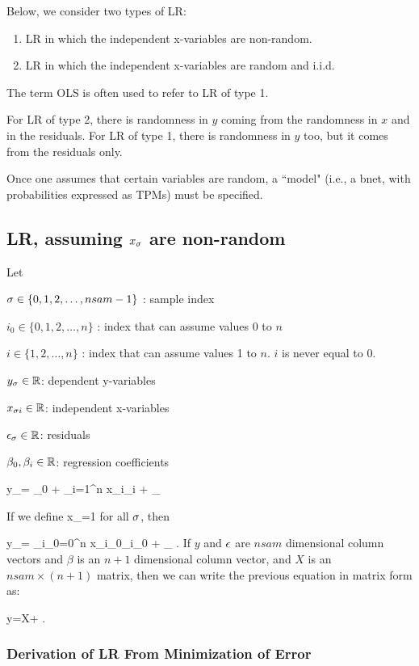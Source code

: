 Below, we consider two types of LR:

\begin{enumerate}
\item
LR
in which the independent x-variables are non-random.
\item
LR
in which the independent x-variables are random
and i.i.d.
\end{enumerate}

The  term OLS
is often used to refer to LR 
of type 1.



For LR of type 2,
there is randomness in $y$ 
coming from the randomness in $x$
and in the residuals.
For LR of type 1,
there  is randomness in $y$
too, but
it comes 
from the residuals
only. 

Once one assumes that certain
variables are random, a ``model" (i.e., a bnet,
with probabilities expressed as TPMs)
 must be 
specified.


\subsection{LR, assuming
$x_\sigma$ are non-random}

Let

$\sigma\in\{0, 1, 2, \ldots, nsam-1\}$ : sample index

$i_0\in\{0, 1, 2, \ldots, n\}$ : 
index that can assume values 0 to $n$

$i\in\{1, 2, \ldots, n\}$ : 
index that can assume values 1 to $n$.
$i$ is never equal to 0.


$y_\sigma\in { \mathbb{R}}$: dependent y-variables

$x_{\sigma i}\in { \mathbb{R}}$: independent x-variables

$\epsilon_\sigma\in { \mathbb{R}}$: residuals

$\beta_0, \beta_i\in { \mathbb{R}}$: 
regression coefficients


\beq
y_\s= \beta_0 +
\sum_{i=1}^{n} x_{\s i}\beta_{i} + \eps_\s
\eeq

If we define
\beq
x_{}=1
\;
\eeq
for all $\sigma$, then

\beq
y_\s=
\sum_{i_0=0}^{n} x_{\s i_0}\beta_{i_0} + \eps_\s
\;.
\eeq
If $y$ and $\epsilon$ are $nsam$ dimensional
 column vectors and $\beta$
is an $n+1$ dimensional column vector,
and $X$ is an $nsam\times (n+1)$ matrix, 
then we can write the previous equation in matrix
form as:


\beq
y=X\beta+\eps
\;.
\eeq

\subsubsection{Derivation of LR
 From Minimization of Error}

